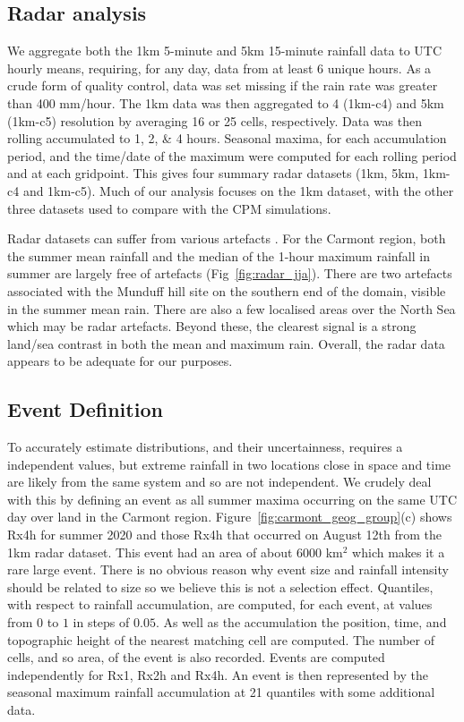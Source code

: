 \documentclass[11pt,a4paper]{article}
\begin{document}
\subsection{Radar analysis}
We aggregate both the  1km 5-minute and 5km 15-minute rainfall data to UTC hourly means, requiring, for any day, data from at least 6  unique hours. As a crude form of quality control, data was set missing if the rain rate was greater than 400 mm/hour.  The 1km data was then aggregated to 4 (1km-c4) and 5km (1km-c5) resolution by averaging 16 or 25 cells, respectively. Data was then rolling accumulated to 1, 2, \&  4 hours. Seasonal maxima, for each accumulation period,  and the time/date of the  maximum were computed for each rolling period and at each gridpoint. This gives four summary radar datasets (1km, 5km,  1km-c4 and  1km-c5). Much of our analysis focuses on the 1km dataset, with the  other three datasets used to compare with the CPM simulations. 

Radar datasets can suffer from various artefacts \parencite{Overeem2023euradclim}.
For the Carmont region, both the summer mean rainfall and the median of the 1-hour maximum rainfall in summer are largely free of artefacts (Fig~\ref{fig:radar_jja}). There are two artefacts associated with the Munduff hill site on the southern end of the domain, visible in the summer mean rain. There are also a few localised areas over the North Sea which may be radar artefacts.  Beyond these, the clearest signal is a strong land/sea contrast in both the mean and maximum rain. Overall, the radar data appears to be adequate for our purposes.  

\subsection{Event Definition}


To accurately estimate distributions, and their uncertainness,  requires a independent values, but extreme rainfall in two locations close in space and time are likely from the same  system and so are not independent.  We crudely deal with this by defining an event  as all summer maxima  occurring on the same UTC day over land in the Carmont region. Figure~\ref{fig:carmont_geog_group}(c) shows Rx4h  for summer 2020 and  those Rx4h  that occurred on  August 12th  from the 1km radar dataset. This event had an area of about 6000 km$^2$ which makes it a rare large event. There is no obvious  reason why event size and rainfall intensity should be related to size so we believe this is not a selection effect.  Quantiles, with respect to rainfall accumulation,  are computed, for each event,  at values from $0$ to $1$ in steps of $0.05$. As well as the accumulation the position, time, and topographic height of the nearest matching cell are computed. The  number of cells, and so area, of the event is also recorded.  Events are computed independently for Rx1, Rx2h and Rx4h. An event is then represented by the seasonal maximum rainfall accumulation at 21  quantiles  with some additional data. 
\end{document}
